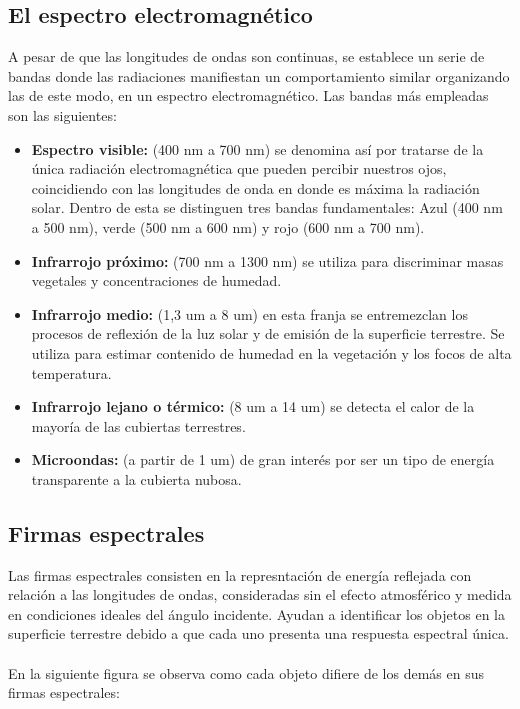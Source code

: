 \subsection{El espectro electromagn\'etico}
A pesar de que las longitudes de ondas son continuas, se establece un serie de bandas donde las radiaciones manifiestan un comportamiento similar organizando las de este modo, en un espectro electromagn\'etico\cite{remote2010abdulrahman}.
Las bandas m\'as empleadas son las siguientes\cite{salinero2002teledeteccion}:
	\begin{itemize}
		\item \textbf{Espectro visible:} (400 nm a 700 nm) se denomina as\'i por tratarse de la \'unica radiaci\'on electromagn\'etica que pueden percibir nuestros ojos, coincidiendo con las longitudes de onda en donde es m\'axima la radiaci\'on solar. Dentro de esta se distinguen tres bandas fundamentales: Azul (400 nm a 500 nm), verde (500 nm a 600 nm) y rojo (600 nm a 700 nm).
		\item \textbf{Infrarrojo pr\'oximo:} (700 nm a 1300 nm) se utiliza para discriminar masas vegetales y concentraciones de humedad.
		\item \textbf{Infrarrojo medio:} (1,3 um a 8 um) en esta franja se entremezclan los procesos de reflexi\'on de la luz solar y de emisi\'on de la superficie terrestre. Se utiliza para estimar contenido de humedad en la vegetaci\'on y los focos de alta temperatura.
		\item \textbf{Infrarrojo lejano o térmico:} (8 um a 14 um) se detecta el calor de la mayor\'ia de las cubiertas terrestres.
		\item \textbf{Microondas:} (a partir de 1 um) de gran inter\'es por ser un tipo de energ\'ia transparente a la cubierta nubosa.
	\end{itemize}

\subsection{Firmas espectrales}
Las firmas espectrales consisten en la represntaci\'on de energ\'ia reflejada con relaci\'on a las longitudes de ondas, consideradas sin el efecto atmosf\'erico y medida en condiciones ideales del \'angulo incidente. Ayudan a identificar los objetos en la superficie terrestre debido a que cada uno presenta una respuesta espectral \'unica\cite{sivakumar2004satellite}.\\~\\
En la siguiente figura se observa como cada objeto difiere de los dem\'as en sus firmas espectrales:

